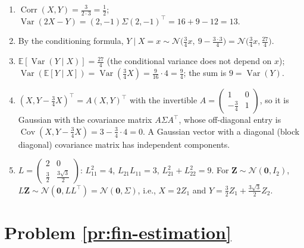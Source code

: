 \documentclass[11pt]{article}
\newcommand{\E}{\mathbb{E}}
\DeclareMathOperator{\Var}{Var}
\DeclareMathOperator{\Cov}{Cov}
\DeclareMathOperator{\Corr}{Corr}
\begin{document}
\begin{enumerate}[label=(\alph*)]
    \item $\Corr(X, Y) = \frac{3}{2 \cdot 3} = \frac{1}{2}$; $\Var(2X - Y) = (2, -1)\Sigma(2, -1)^\top = 16 + 9 - 12 = 13$.
    \item By the conditioning formula, $Y \mid X = x \sim \mathcal{N}\big(\frac{3}{4}x, \ 9 - \frac{3 \cdot 3}{4}\big) = \mathcal{N}\big(\frac{3}{4}x, \frac{27}{4}\big)$.
    \item $\E[\Var(Y \mid X)] = \frac{27}{4}$ (the conditional variance does not depend on $x$); $\Var(\E[Y \mid X]) = \Var(\frac{3}{4}X) = \frac{9}{16} \cdot 4 = \frac{9}{4}$; the sum is $9 = \Var(Y)$.
    \item $(X, Y - \frac{3}{4}X)^\top = A(X, Y)^\top$ with the invertible $A = \begin{pmatrix} 1 & 0 \\ -\frac{3}{4} & 1 \end{pmatrix}$, so it is Gaussian with the covariance matrix $A\Sigma A^\top$, whose off-diagonal entry is $\Cov(X, Y - \frac{3}{4}X) = 3 - \frac{3}{4} \cdot 4 = 0$. A Gaussian vector with a diagonal (block diagonal) covariance matrix has independent components.
    \item $L = \begin{pmatrix} 2 & 0 \\ \frac{3}{2} & \frac{3\sqrt 3}{2} \end{pmatrix}$: $L_{11}^2 = 4$, $L_{21}L_{11} = 3$, $L_{21}^2 + L_{22}^2 = 9$. For $\mathbf{Z} \sim \mathcal{N}(\mathbf{0}, I_2)$, $L\mathbf{Z} \sim \mathcal{N}(\mathbf{0}, LL^\top) = \mathcal{N}(\mathbf{0}, \Sigma)$, i.e., $X = 2Z_1$ and $Y = \frac{3}{2}Z_1 + \frac{3\sqrt 3}{2}Z_2$.
\end{enumerate}

\section*{Problem \ref{pr:fin-estimation}}
\end{document}
